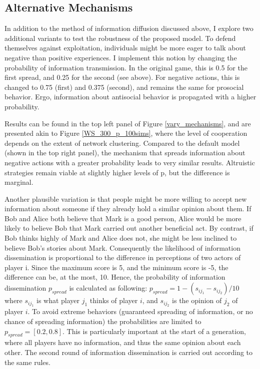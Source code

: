 \documentclass{JASSS}
\begin{document}
\subsection*{Alternative Mechanisms}
In addition to the method of information diffusion discussed above, I explore two additional variants to test the robustness of the proposed model. To defend themselves against exploitation, individuals might be more eager to talk about negative than positive experiences. I implement this notion by changing the probability of information transmission. In the original game, this is 0.5 for the first spread, and 0.25 for the second (see above). For negative actions, this is changed to 0.75 (first) and 0.375 (second), and remains the same for prosocial behavior. Ergo, information about antisocial behavior is propagated with a higher probability. 

Results can be found in the top left panel of Figure \ref{vary_mechanisms}, and are presented akin to Figure \ref{WS_300_p_100sims}, where the level of cooperation depends on the extent of network clustering. Compared to the default model (shown in the top right panel), the mechanism that spreads information about negative actions with a greater probability leads to very similar results. Altruistic strategies remain viable at slightly higher levels of p, but the difference is marginal.

Another plausible variation is that people might be more willing to accept new information about someone if they already hold a similar opinion about them. If Bob and Alice both believe that Mark is a good person, Alice would be more likely to believe Bob that Mark carried out another beneficial act. By contrast, if Bob thinks highly of Mark and Alice does not, she might be less inclined to believe Bob's stories about Mark. Consequently the likelihood of information dissemination is proportional to the difference in perceptions of two actors of player i. Since the maximum score is 5, and the minimum score is -5, the difference can be, at the most, 10. Hence, the probability of information dissemination $p_{spread}$ is calculated as following: $p_{spread}=1-(s_{ij_1}-s_{ij_2})/10$ where $s_{ij_1}$ is what player $j_1$ thinks of player $i$, and $s_{ij_2}$ is the opinion of $j_2$ of player $i$. To avoid extreme behaviors (guaranteed spreading of information, or no chance of spreading information) the probabilities are limited to $p_{spread}=[0.2,0.8]$. This is particularly important at the start of a generation, where all players have no information, and thus the same opinion about each other. The second round of information dissemination is carried out according to the same rules.
\end{document}
